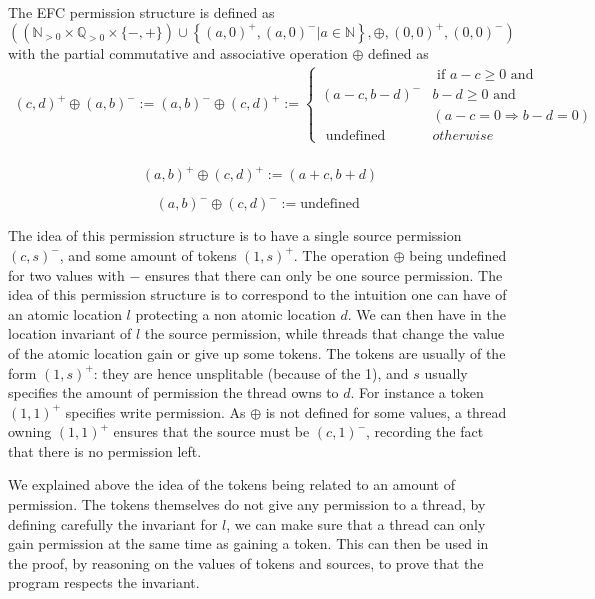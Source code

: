 The EFC permission structure is defined as 
\[\left(\left(\mathbb{N}_{>0} \times \mathbb{Q}_{>0} \times\{-,+\}\right) \cup\left\{(a, 0)^{+},(a, 0)^{-} | a \in \mathbb{N}\right\}, \oplus,(0,0)^{+},(0,0)^{-}\right)\]
with the partial commutative and associative operation $\oplus$ defined as 
\[\begin{array}{r}
{(c, d)^{+} \oplus(a, b)^{-} :=(a, b)^{-} \oplus(c, d)^{+} :=
\left\{\begin{array}{cl}
&{\text { if } a-c }{\geq 0 \text { and }} \\ 

{(a-c, b-d)^{-}} & {b-d }{\geq 0 \text { and }} 
\\ &({a-c}  {=0 \Rightarrow} {b-d}  {=0})\\

{\text { undefined }}&{{otherwise }}
\end{array}\right.} \\ 
\end{array}
\]
		
\[(a, b)^{+} \oplus(c, d)^{+} :=(a+c, b+d)\]

\[(a, b)^{-} \oplus(c, d)^{-} :=\text {undefined }\]

The idea of this permission structure is to have a single source permission $(c, s)^-$, and some amount of tokens $(1, s)^+$. The operation $\oplus$ being undefined for two values with $-$ ensures that there can only be one source permission. The idea of this permission structure is to correspond to the intuition one can have of an atomic location $l$ protecting a non atomic location $d$. We can then have in the location invariant of $l$ the source permission, while threads that change the value of the atomic location gain or give up some tokens. The tokens are usually of the form $(1, s)^+$: they are hence unsplitable (because of the 1), and $s$ usually specifies the amount of permission the thread owns to $d$. For instance a token $(1, 1)^+$ specifies write permission. As $\oplus$ is not defined for some values, a thread owning $(1, 1)^+$ ensures that the source must be $(c, 1)^-$, recording the fact that there is no permission left.

We explained above the idea of the tokens being related to an amount of permission. The tokens themselves do not give any permission to a thread, by defining carefully the invariant for $l$, we can make sure that a thread can only gain permission at the same time as gaining a token. This can then be used in the proof, by reasoning on the values of tokens and sources, to prove that the program respects the invariant.

